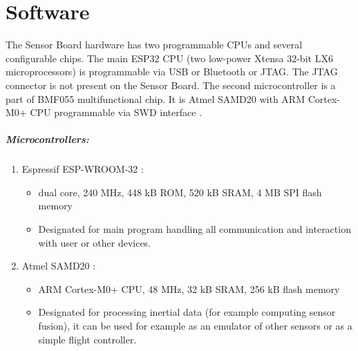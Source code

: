 \chapter{Software}
The Sensor Board hardware has two programmable CPUs and several configurable chips. The main ESP32 CPU (two low-power Xtensa 32-bit LX6 microprocessors) \cite{espressif:ESP-WROOM-32} is programmable via USB or Bluetooth or JTAG. The JTAG connector is not present on the Sensor Board. The second microcontroller is a part of BMF055 \cite{bosch:BMF055} multifunctional chip. It is Atmel SAMD20 \cite{atmel:SAMD20} with ARM Cortex-M0+ CPU programmable via SWD interface \cite{SWDinterface}.

\paragraph{Microcontrollers:}
\begin{enumerate}
	\item Espressif ESP-WROOM-32 \cite{espressif:ESP-WROOM-32}:
	\begin{itemize}
		\item dual core, 240 MHz, 448 kB ROM, 520 kB SRAM, 4 MB SPI flash memory
		\item Designated for main program handling all communication and interaction with user or other devices.
	\end{itemize}
	\item Atmel SAMD20 \cite{atmel:samd20}:
	\begin{itemize}
		\item ARM Cortex-M0+ CPU, 48 MHz, 32 kB SRAM, 256 kB flash memory
		\item Designated for processing inertial data (for example computing sensor fusion), it can be used for example as an emulator of other sensors or as a simple flight controller.
	\end{itemize}
\end{enumerate}

